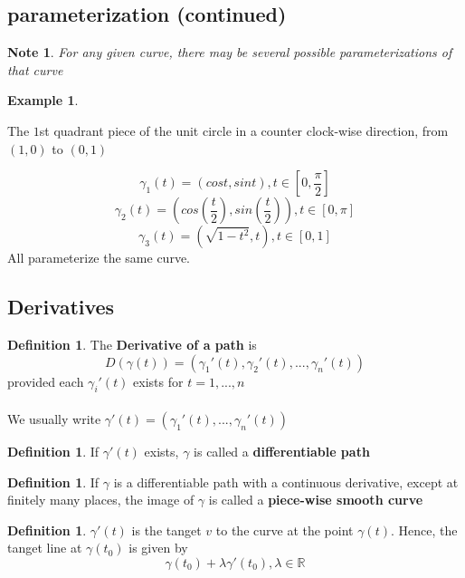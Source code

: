 \documentclass[12pt]{article}
\theoremstyle{plain}
\newtheorem*{note}{Note}
\theoremstyle{definition}
\newtheorem{definition}[theorem]{Definition}
\newtheorem{example}[theorem]{Example}
\begin{document}
\subsection{parameterization (continued)}

\begin{note}
	For any given curve, there may be several possible parameterizations of that curve
\end{note}

\begin{example}

\end{example} The $1$st quadrant piece of the unit circle in a counter clock-wise direction, from $(1,0)$ to $(0,1)$

$$\gamma_1 (t) = (cost, sint), t\in [0, \frac{\pi}{2}]$$
$$\gamma_2 (t) = (cos(\frac{t}{2}), sin(\frac{t}{2})), t\in [0, \pi]$$
$$\gamma_3 (t) = (\sqrt{1-t^2}, t), t\in [0, 1]$$
All parameterize the same curve.

\subsection{Derivatives}

\begin{definition}
	The \textbf{Derivative of a path} is
	$$D(\gamma(t)) = (\gamma_1'(t), \gamma_2'(t), ... , \gamma_n'(t))$$
	provided each $\gamma_i'(t)$ exists for $t=1,...,n$\\
	\\
	We usually write $\gamma' (t) = (\gamma_1'(t),...,\gamma_n'(t))$
\end{definition}

\begin{definition}
	If $\gamma'(t)$ exists, $\gamma$ is called a \textbf{differentiable path}
\end{definition}

\begin{definition}
	If $\gamma$ is a differentiable path with a continuous derivative, except at finitely many places, the image of $\gamma$ is called a \textbf{piece-wise smooth curve}
\end{definition}

\begin{definition}
	$\gamma'(t)$ is the tanget $v$ to the curve at the point $\gamma (t)$. Hence, the tanget line at $\gamma (t_0)$ is given by
	$$\gamma (t_0) + \lambda \gamma ' (t_0), \lambda \in \mathbb{R}$$
\end{definition}
\end{document}
